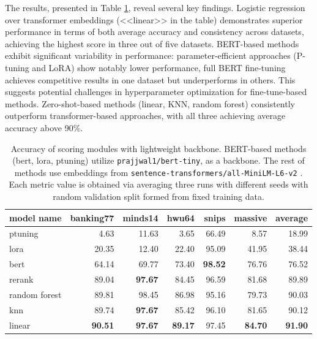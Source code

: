 The results, presented in Table \ref{tab:scoring_light}, reveal several key findings. Logistic regression over transformer embeddings (<<linear>> in the table) demonstrates superior performance in terms of both average accuracy and consistency across datasets, achieving the highest score in three out of five datasets. BERT-based methods exhibit significant variability in performance: parameter-efficient approaches (P-tuning and LoRA) show notably lower performance, full BERT fine-tuning achieves competitive results in one dataset but underperforms in others. This suggests potential challenges in hyperparameter optimization for fine-tune-based methods. Zero-shot-based methods (linear, KNN, random forest) consistently outperform transformer-based approaches, with all three achieving average accuracy above 90\%.

\begin{table}[h]
\begin{tabular}{l|rrrrr|r}
\toprule
model name & banking77 & minds14 & hwu64 & snips & massive & average \\
\midrule
ptuning & 4.63 & 11.63 & 3.65 & 66.49 & 8.57 & 18.99 \\
lora & 20.35 & 12.40 & 22.40 & 95.09 & 41.95 & 38.44 \\
bert & 64.14 & 69.77 & 73.40 & \textbf{98.52} & 76.76 & 76.52 \\
rerank & 89.04 & \textbf{97.67} & 84.45 & 96.59 & 81.68 & 89.89 \\
random forest & 89.81 & 98.45 & 86.98 & 95.16 & 79.73 & 90.03 \\
knn & 89.74 & \textbf{97.67} & 85.42 & 96.10 & 81.65 & 90.12 \\
linear & \textbf{90.51} & \textbf{97.67} & \textbf{89.17} & 97.45 & \textbf{84.70} & \textbf{91.90} \\
\bottomrule
\end{tabular}
\centering
\caption{Accuracy of scoring modules with lightweight backbone. BERT-based methods (bert, lora, ptuning) utilize \texttt{prajjwal1/bert-tiny}, \cite{bhargava2021generalization,tinybert} as a backbone. The rest of methods use embeddings from \texttt{sentence-transformers/all-MiniLM-L6-v2} \cite{reimers-2019-sentence-bert}. Each metric value is obtained via averaging three runs with different seeds with random validation split formed from fixed training data.}
\label{tab:scoring_light}
\end{table}

